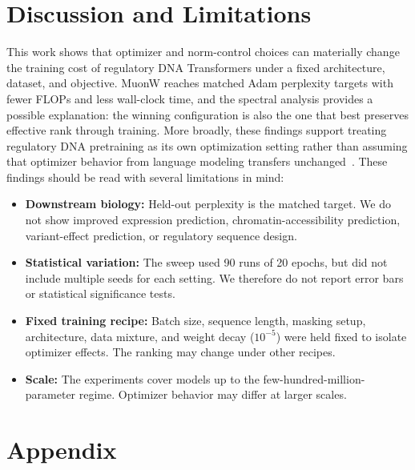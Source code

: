 \documentclass{article}
\begin{document}
\section{Discussion and Limitations}
\label{sec:discussion}

This work shows that optimizer and norm-control choices can materially change the training cost of regulatory DNA Transformers under a fixed architecture, dataset, and objective. MuonW reaches matched Adam perplexity targets with fewer FLOPs and less wall-clock time, and the spectral analysis provides a possible explanation: the winning configuration is also the one that best preserves effective rank through training. More broadly, these findings support treating regulatory DNA pretraining as its own optimization setting rather than assuming that optimizer behavior from language modeling transfers unchanged~\citep{wilson,nfl}. These findings should be read with several limitations in mind:
\begin{itemize}
  \item \textbf{Downstream biology:} Held-out perplexity is the matched target. We do not show improved expression prediction, chromatin-accessibility prediction, variant-effect prediction, or regulatory sequence design.
  \item \textbf{Statistical variation:} The sweep used 90 runs of 20 epochs, but did not include multiple seeds for each setting. We therefore do not report error bars or statistical significance tests.
  \item \textbf{Fixed training recipe:} Batch size, sequence length, masking setup, architecture, data mixture, and weight decay ($10^{-5}$) were held fixed to isolate optimizer effects. The ranking may change under other recipes.
  \item \textbf{Scale:} The experiments cover models up to the few-hundred-million-parameter regime. Optimizer behavior may differ at larger scales.
\end{itemize}


\clearpage



\clearpage
\appendix
\section*{Appendix}
\end{document}
